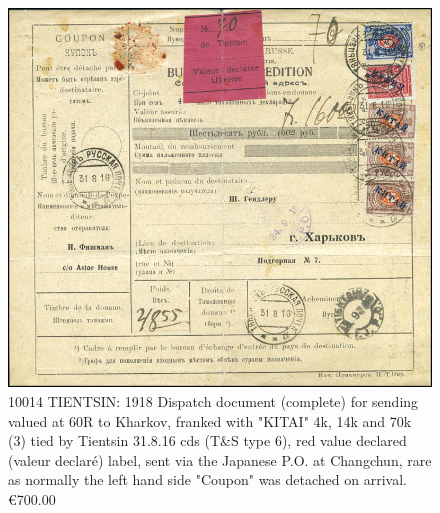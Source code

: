 \begin{figure}[htbp]
\centering
\includegraphics[width=.95\textwidth]{../russian-post-offices-in-china/10014.jpg}
\caption{
10014 TIENTSIN: 1918 Dispatch document (complete) for sending valued at 60R to 
Kharkov, franked with "KITAI" 4k, 14k and 70k (3) tied by Tientsin 31.8.16 cds 
(T\&S type 6), red value declared (valeur declar\'e) label, sent via the 
Japanese P.O. at Changchun, rare as normally the left 
hand side "Coupon" was detached on arrival.
\euro 700.00 
}  
\end{figure}

